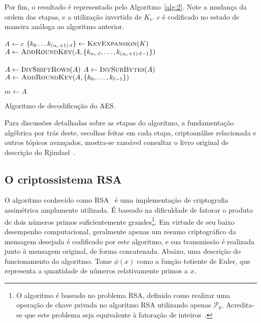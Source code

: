 \documentclass[12pt]{report}
\newcommand{\pk}{\mathcal{P}_k}
\begin{document}
Por fim, o resultado é representado pelo Algoritmo~\ref{alg:2}.
Note a mudança da ordem das etapas, e a utilização invertida de $K_e$. $c$ é
codificado no estado de maneira análoga ao algoritmo anterior.

\begin{algorithm}[H]
  \small

  $A \leftarrow c$\;
  $\{k_{0} \dots k_{(n_r + 1) \cdot \ell}\}
    \leftarrow \textsc{KeyExpansion}(K)$\;
  $A \leftarrow \textsc{AddRoundKey}(A,
    \{k_{n_r \cdot \ell}, \dots, k_{(n_r + 1) \cdot \ell - 1}\})$\;


  $A \leftarrow \textsc{InvShiftRows}(A)$\;
  $A \leftarrow \textsc{InvSubBytes}(A)$\;
  $A \leftarrow \textsc{AddRoundKey}(A,
    \{k_{0}, \dots, k_{\ell - 1}\})$\;

  $m \leftarrow A$\;
  \caption{Algoritmo de decodificação do AES.}
  \label{alg:2}
\end{algorithm}

Para discussões detalhadas sobre as etapas do algoritmo, a fundamentação
algébrica por trás deste, escolhas feitas em cada etapa, criptoanálise
relacionada e outros tópicos avançados, mostra-se razoável consultar
o livro original de descrição do Rjindael~\cite{Daemen:2002:DR:560131}.

\subsection{O criptossistema RSA}

O algoritmo conhecido como RSA~\cite{Rivest:1978:MOD:359340.359342} é uma
implementação de criptografia assimétrica amplamente utilizada. É baseado na
dificuldade de fatorar o produto de dois números primos suficientemente
grandes\footnote{O algoritmo é baseado no problema RSA, definido como realizar
uma operação de chave privada no algoritmo RSA utilizando apenas $\pk{}$.
Acredita-se que este problema seja equivalente à fatoração de
inteiros~\cite[3.30]{Menezes:1996:HAC:548089}.}. Em virtude de seu baixo
desempenho computacional, geralmente apenas um resumo criptográfico da mensagem
desejada é codificado por este algoritmo, e sua transmissão é realizada
junto à mensagem original, de forma concatenada. Abaixo, uma descrição do
funcionamento do algoritmo. Tome $\phi(x)$ como a função totiente de Euler, que
representa a quantidade de números relativamente primos a $x$.
\end{document}
